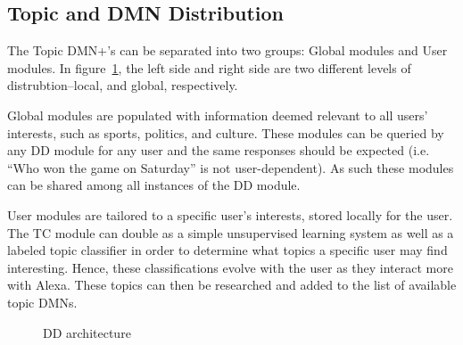 \documentclass[10pt,twoside,twocolumn]{article}
\begin{document}
\subsection{Topic and DMN Distribution}
The Topic DMN+'s can be separated into two groups: Global modules and User modules. In figure~\ref{DD_design}, the left side and right side are two different levels of distrubtion--local, and global, respectively.

\noindent
Global modules are populated with information deemed relevant to all users' interests, such as sports, politics, and culture. These modules can be queried by any DD module for any user and the same responses should be expected (i.e. ``Who won the game on Saturday'' is not user-dependent). As such these modules can be shared among all instances of the DD module.

\noindent
User modules are tailored to a specific user's interests, stored locally for the user. The TC module can double as a simple unsupervised learning system as well as a labeled topic classifier in order to determine what topics a specific user may find interesting. Hence, these classifications evolve with the user as they interact more with Alexa. These topics can then be researched and added to the list of available topic DMNs.

\begin{figure}
    \centering
    
    \label{DD_design}
    \caption{DD architecture}
\end{figure}
\end{document}
